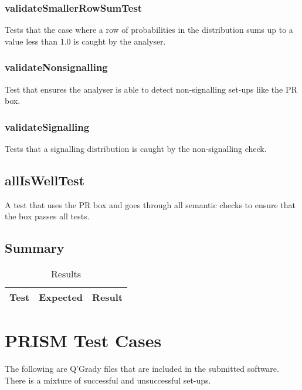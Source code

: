 \documentclass[report.tex]{subfiles}
\begin{document}
\subsubsection{validateSmallerRowSumTest} %
\label{ssub:validatesmallerrowsumtest}
Tests that the case where a row of probabilities in the distribution sums up to
a value less than 1.0 is caught by the analyser.

\subsubsection{validateNonsignalling} %
\label{ssub:validatenonsignalling}
Test that ensures the analyser is able to detect non-signalling set-ups like the
PR box.

\subsubsection{validateSignalling} %
\label{ssub:validatesignalling}
Tests that a signalling distribution is caught by the non-signalling check.

\subsection{allIsWellTest} %
\label{sub:alliswelltest}
A test that uses the PR box and goes through all semantic checks to ensure that
the box passes all tests.

\subsection{Summary} %
\label{sub:semantics_summary}
\begin{table}[H]
    \centering
    \begin{tabular}{l | l | l}
    Test & Expected & Result \\
    \hline
    \end{tabular}
    \caption{Results}
  \label{tab:semantics_summary}
\end{table}

\section{PRISM Test Cases} %
\label{sec:prism_test_cases}
The following are Q'Grady files that are included in the submitted software.
There is a mixture of successful and unsuccessful set-ups.
\end{document}
